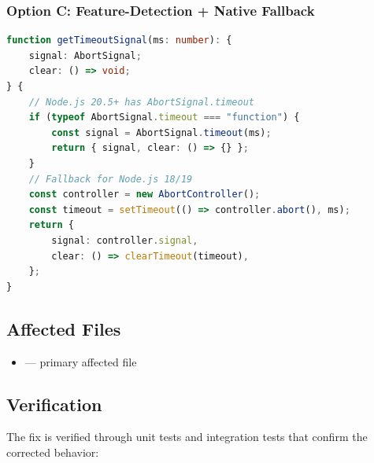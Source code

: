 \subsubsection*{Option C: Feature-Detection + Native Fallback}



\begin{lstlisting}[language=TypeScript]
function getTimeoutSignal(ms: number): {
    signal: AbortSignal;
    clear: () => void;
} {
    // Node.js 20.5+ has AbortSignal.timeout
    if (typeof AbortSignal.timeout === "function") {
        const signal = AbortSignal.timeout(ms);
        return { signal, clear: () => {} };
    }
    // Fallback for Node.js 18/19
    const controller = new AbortController();
    const timeout = setTimeout(() => controller.abort(), ms);
    return {
        signal: controller.signal,
        clear: () => clearTimeout(timeout),
    };
}

\end{lstlisting}




\subsection*{Affected Files}
\begin{itemize}
    \item {} — primary affected file
\end{itemize}

\subsection*{Verification}
The fix is verified through unit tests and integration tests that confirm the corrected behavior:

